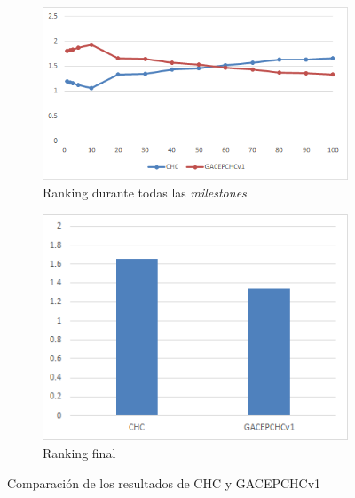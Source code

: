 \begin{figure}[h]
     \centering
     \begin{subfigure}[b]{0.45\textwidth}
         \centering
         \includegraphics[width=\textwidth]{imagenes/Experimental/CHCvsGACEPCHCv1.png}
         \caption{Ranking durante todas las \textit{milestones}}
         \label{fig:CHCvsGACEPCHCv1_lineas}
     \end{subfigure}
     \hfill
     \begin{subfigure}[b]{0.45\textwidth}
         \centering
         \includegraphics[width=\textwidth]{imagenes/Experimental/barras/CHCvsGACEPCHCv1.png}
         \caption{Ranking final}
         \label{fig:CHCvsGACEPCHCv1_barras}
     \end{subfigure}
        \caption{Comparación de los resultados de CHC y GACEPCHCv1}
        \label{fig:CHCvsGACEPCHCv1}
\end{figure}

